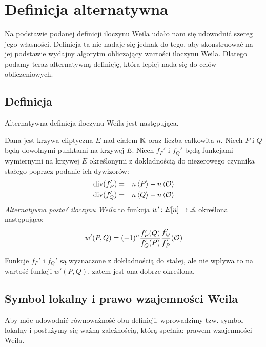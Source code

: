 \section{Definicja alternatywna}

\noindent
Na podstawie podanej definicji iloczynu Weila
udało nam się udowodnić szereg jego własności.
Definicja ta nie nadaje się jednak do tego,
aby skonstruować na jej podstawie
wydajny algorytm obliczający wartości iloczynu Weila.
Dlatego podamy teraz alternatywną definicję,
która lepiej nada się do celów obliczeniowych.

\subsection*{Definicja}

\noindent
Alternatywna definicja iloczynu Weila jest następująca.

\begin{definition}\label{weil_pairing_alt_def}
Dana jest krzywa eliptyczna $E$ nad ciałem $\mathbb{K}$
oraz liczba całkowita $n$.
Niech $P$ i $Q$ będą dowolnymi punktami na krzywej $E$.
Niech $f_P'$ i $f_Q'$ będą funkcjami wymiernymi na krzywej $E$
określonymi z dokładnością do niezerowego czynnika stałego
poprzez podanie ich dywizorów:
\begin{eqnarray*}
\operatorname{div}(f_P') & = & n\left\langle P\right\rangle - n\left\langle\mathcal{O}\right\rangle \\
\operatorname{div}(f_Q') & = & n\left\langle Q\right\rangle - n\left\langle\mathcal{O}\right\rangle
\end{eqnarray*}
\emph{Alternatywna postać iloczynu Weila}
to funkcja $w'\colon E[n] \to \mathbb{K}$
określona następująco:
\begin{equation}\label{weil_pairing_alt_eqn}
w'(P, Q) = (-1)^n\frac{f_P'(Q)}{f_Q'(P)}\frac{f_Q'}{f_P'}(\mathcal{O})
\end{equation}
\end{definition}

\begin{remark}
Funkcje $f_P'$ i $f_Q'$ są wyznaczone z dokładnością do stałej,
ale nie wpływa to na wartość funkcji $w'(P, Q)$,
zatem jest ona dobrze określona.
\end{remark}

\subsection*{Symbol lokalny i prawo wzajemności Weila}

\noindent
Aby móc udowodnić równoważność obu definicji,
wprowadzimy tzw. symbol lokalny
i posłużymy się ważną zależnością, którą spełnia:
prawem wzajemności Weila.

